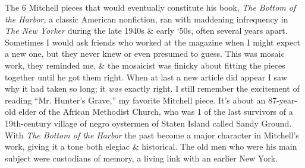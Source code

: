 \documentclass{article}
\begin{document}
The 6 Mitchell pieces that would eventually constitute his book, \textit{The Bottom of the Harbor}, a classic American nonfiction, ran with maddening infrequency in \textit{The New Yorker} during the late 1940s \& early `50s, often several years apart. Sometimes I would ask friends who worked at the magazine when I might expect a new one, but they never knew or even presumed to guess. This was mosaic work, they reminded me, \& the mosaicist was finicky about fitting the pieces together until he got them right. When at last a new article did appear I saw why it had taken so long; it \textit{was} exactly right. I still remember the excitement of reading ``Mr. Hunter's Grave,'' my favorite Mitchell piece. It's about an 87-year-old elder of the African Methodist Church, who was 1 of the last survivors of a 19th-century village of negro oystermen of Staten Island called Sandy Ground. With \textit{The Bottom of the Harbor} the past become a major character in Mitchell's work, giving it a tone both elegiac \& historical. The old men who were his main subject were custodians of memory, a living link with an earlier New York.
\end{document}
